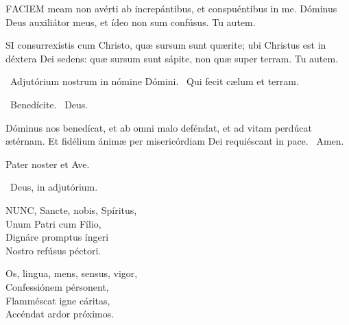 


\lettrine[lines=2]{F}{ACIEM} meam non avérti ab increpántibus, et conspuéntibus in me. Dóminus Deus auxiliátor meus, et ídeo non sum confúsus. Tu autem.



\lettrine[lines=2]{S}{I} consurrexístis cum Christo, quæ sursum sunt quærite; ubi Christus est in déxtera Dei sedens: quæ sursum sunt sápite, non quæ super terram. Tu autem.




\V\ Adjutórium nostrum in nómine Dómini. \R\ Qui fecit cælum et terram.

\V\ Benedícite. \R\ Deus.

 Dóminus nos benedícat, et ab omni malo deféndat, et ad vitam perdúcat ætérnam. Et fidélium ánimæ per misericórdiam Dei requiéscant in pace. \R\ Amen.



Pater noster et Ave.

\V\ Deus, in adjutórium.


\lettrine[lines=2]{N}{UNC}, Sancte, nobis, Spíritus,\\
Unum Patri cum Fílio,\\
Dignáre promptus íngeri\\
Nostro refúsus péctori.

Os, lingua, mens, sensus, vigor,\\
Confessiónem pérsonent,\\
Flamméscat igne cáritas,\\
Accéndat ardor próximos.

